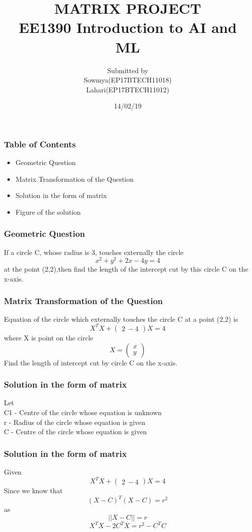 \documentclass{beamer}
\title{MATRIX PROJECT\\EE1390 Introduction to AI and ML}
\author{Submitted by\\Sowmya(EP17BTECH11018)\\Lahari(EP17BTECH11012)}
\institute{Indian Institute of Technology Hyderabad}
\date{14/02/19}
\begin{document}
 
\frame{\titlepage}
 
\begin{frame}
\frametitle{Table of Contents}
\begin{itemize}
\item Geometric Question
\item Matrix Transformation of the Question
\item Solution in the form of matrix
\item Figure of the solution
\end{itemize}
\end{frame}
 
\begin{frame}
\frametitle{Geometric Question}
If a circle C, whose radius is 3,  touches externally the circle $$x^2+y^2+2x-4y = 4$$ at the point (2,2),then find the length of the intercept cut by this circle C on the x-axis.
\end{frame}

\begin{frame}
\frametitle{Matrix Transformation of the Question}
Equation of the circle which externally touches the circle C at a point (2,2) is  $$X^TX+\begin{pmatrix} 2  \ -4\end{pmatrix}X = 4$$ where 
X is point on the circle $$ X = \begin{pmatrix} x \\ y \end{pmatrix}$$
Find the length of intercept cut by circle C on the x-axis.
\end{frame}

\begin{frame}
\frametitle{Solution in the form of matrix}
Let\\
C1 - Centre of the circle whose equation is unknown\\
r - Radius of the circle whose equation is given\\
C - Centre of the circle whose equation is given\\
\end{frame}

\begin{frame}
\frametitle{Solution in the form of matrix}
Given\\
\begin{equation}
X^TX+\begin{pmatrix} 2  \ -4\end{pmatrix}X = 4
\end{equation}
Since we know that $$(X-C)^T(X-C) = r^2$$ as
$$ ||X-C|| = r$$
\begin{equation}
X^TX-2C^TX = r^2 - C^TC
\end{equation}
\end{frame}
\end{document}
